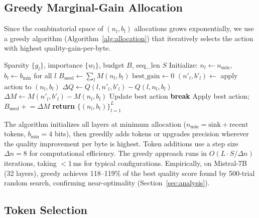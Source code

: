 \documentclass{article}
\newcommand{\nlayers}{L}
\begin{document}
\subsection{Greedy Marginal-Gain Allocation}
\label{sec:algorithm}

Since the combinatorial space of $(n_l, b_l)$ allocations grows exponentially, we use a greedy algorithm (Algorithm~\ref{alg:allocation}) that iteratively selects the action with highest quality-gain-per-byte.

\begin{algorithm}[t]
\caption{LayerBudget Greedy Allocation}
\label{alg:allocation}
\begin{algorithmic}[1]
\REQUIRE Sparsity $\{g_l\}$, importance $\{w_l\}$, budget $B$, seq\_len $S$
\STATE Initialize: $n_l \leftarrow n_{\min}$, $b_l \leftarrow b_{\min}$ for all $l$
\STATE $B_{\text{used}} \leftarrow \sum_l M(n_l, b_l)$
    \STATE $\text{best\_gain} \leftarrow 0$
    \FOR{each layer $l = 1, \ldots, \nlayers$}
            \STATE $(n'_l, b'_l) \leftarrow$ apply action to $(n_l, b_l)$
            \STATE $\Delta Q \leftarrow Q(l, n'_l, b'_l) - Q(l, n_l, b_l)$
            \STATE $\Delta M \leftarrow M(n'_l, b'_l) - M(n_l, b_l)$
                \STATE Update best action
            \ENDIF
        \ENDFOR
    \ENDFOR
        \STATE \textbf{break}
    \ENDIF
    \STATE Apply best action; $B_{\text{used}} \mathrel{+}= \Delta M$
\ENDWHILE
\STATE \textbf{return} $\{(n_l, b_l)\}_{l=1}^{\nlayers}$
\end{algorithmic}
\end{algorithm}

The algorithm initializes all layers at minimum allocation ($n_{\min} = \text{sink} + \text{recent}$ tokens, $b_{\min} = 4$ bits), then greedily adds tokens or upgrades precision wherever the quality improvement per byte is highest.
Token additions use a step size $\Delta n = 8$ for computational efficiency.
The greedy approach runs in $O(\nlayers \cdot S/\Delta n)$ iterations, taking $<$1\,ms for typical configurations.
Empirically, on Mistral-7B (32 layers), greedy achieves 118--119\% of the best quality score found by 500-trial random search, confirming near-optimality (Section~\ref{sec:analysis}).

\subsection{Token Selection}
\label{sec:selection}
\end{document}
